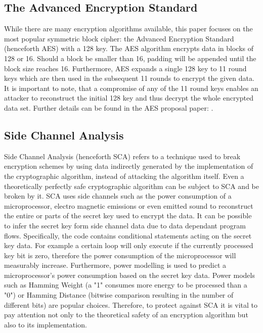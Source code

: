 \documentclass[journal]{IEEEtran}
\begin{document}
\subsection{The Advanced Encryption Standard}
\label{sc:aes}
While there are many encryption algorithms available, this paper focuses on the most popular symmetric block cipher: the Advanced Encryption Standard (henceforth AES) with a \SI{128}{\bit} key. The AES algorithm encrypts data in blocks of \SI{128}{\bit} or \SI{16}{\byte}. Should a block be smaller than \SI{16}{\byte}, padding will be appended until the block size reaches \SI{16}{\byte}. Furthermore, AES expands a single \SI{128}{\bit} key to 11 round keys which are then used in the subsequent 11 rounds to encrypt the given data. It is important to note, that a compromise of any of the 11 round keys enables an attacker to reconstruct the initial \SI{128}{\bit} key and thus decrypt the whole encrypted data set. Further details can be found in the AES proposal paper: \cite{aes:Rijndael_1999}.

\subsection{Side Channel Analysis}
Side Channel Analysis (henceforth SCA) refers to a technique used to break encryption schemes by using data indirectly generated by the implementation of the cryptographic algorithm, instead of attacking the algorithm itself. Even a theoretically perfectly safe cryptographic algorithm can be subject to SCA and be broken by it. SCA uses side channels such as the power consumption of a microprocessor, electro magnetic emissions or even emitted sound to reconstruct the entire or parts of the secret key used to encrypt the data. It can be possible to infer the secret key form side channel data due to data dependant program flows. Specifically, the code contains conditional statements acting on the secret key data. For example a certain loop will only execute if the currently processed key bit is zero, therefore the power consumption of the microprocessor will measurably increase. Furthermore, power modelling is used to predict a microprocessor's power consumption based on the secret key data. Power models such as Hamming Weight (a "1" consumes more energy to be processed than a "0") or Hamming Distance (bitwise comparison resulting in the number of different bits) are popular choices. Therefore, to protect against SCA it is vital to pay attention not only to the theoretical safety of an encryption algorithm but also to its implementation.
\end{document}
